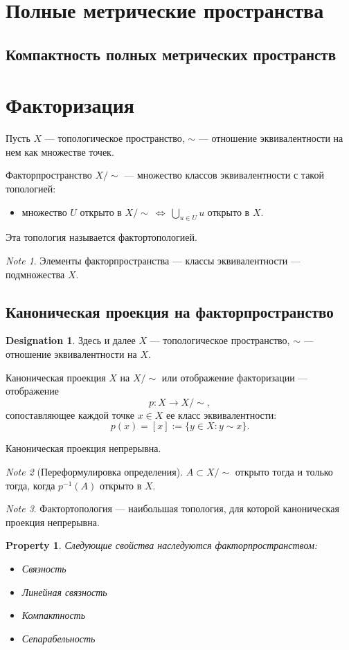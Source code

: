 \documentclass[11pt]{book}
\theoremstyle{definition}
\theoremstyle{plain}
\theoremstyle{plain}
\newtheorem*{prop}{Property}
\theoremstyle{definition}
\newtheorem*{name}{Designation}
\theoremstyle{remark}
\newtheorem*{note}{Note}
\begin{document}
\section{Полные метрические пространства}
\subsection{Компактность полных метрических пространств}
\section{Факторизация}
\begin{defn}
    Пусть $ X$ --- топологическое пространство, $ \sim $ --- отношение эквивалентности на нем как множестве точек.

    Факторпространство $ X/\!\sim $ --- множество классов эквивалентности с такой топологией:
    \begin{itemize}
	\item  множество $ U$ открыто в $ X/\!\sim ~\Longleftrightarrow ~\bigcup_{u \in  U} u$ открыто в $ X$.
    \end{itemize}
    Эта топология называется фактортопологией.
\end{defn}
\begin{note}
    Элементы факторпространства --- классы эквивалентности  --- подмножества $ X$.
\end{note}
\subsection{Каноническая проекция на факторпространство}
\begin{name}
    Здесь и далее $ X$ ---  топологическое пространство, $ \sim $ --- отношение эквивалентности на $ X$.
\end{name}
\begin{defn}
    Каноническая проекция $ X$ на $ X /\! \sim $ или отображение факторизации --- отображение
    \[
	p: X \to  X/\!\sim
    ,\]
    сопоставляющее каждой точке $ x \in  X$ ее класс эквивалентности:
    \[
	p(x) = [x]:=\{y \in  X: y \sim x\}
    .\]
\end{defn}
\begin{thm}
    Каноническая проекция непрерывна.
\end{thm}
\begin{note}[Переформулировка определения]
    $ A \subset X / \!\sim $ открыто тогда и только тогда, когда  $ p^{-1}(A)$ открыто в $ X$.
\end{note}
\begin{note}
    Фактортопология --- наибольшая топология, для которой каноническая проекция непрерывна.
\end{note}
\begin{prop}
    Следующие свойства наследуются факторпространством:
    $ $
    \begin{itemize}
	\item Связность
	\item Линейная связность
	\item Компактность
	\item Сепарабельность
    \end{itemize}
\end{prop}
\end{document}
